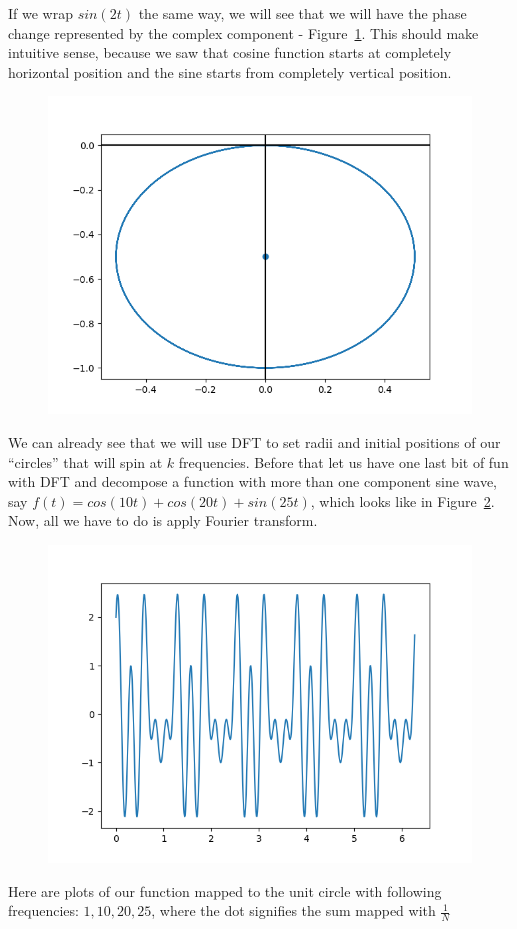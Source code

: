 \documentclass{article}
\begin{document}
    If we wrap $sin(2t)$ the same way, we will see that we will have the phase
    change represented by the complex component - Figure~\ref{fig:sin_wrapped_2k}.
    This should make intuitive sense, because we saw that cosine function starts
    at completely horizontal position and the sine starts from completely vertical
    position. 
    \begin{figure}[H]
        \caption{}
        \centering
        \includegraphics[width=0.4\linewidth]{sin_wrapped_2k}
        \label{fig:sin_wrapped_2k}
    \end{figure}
    We can already see that we will use DFT to set radii and initial positions
    of our ``circles'' that will spin at $k$ frequencies. Before that let us have
    one last bit of fun with DFT and decompose a function with more than one 
    component sine wave, say $f(t) = cos(10t) + cos(20t) + sin(25t)$, which looks
    like in Figure~\ref{fig:composed}. Now, all we have to do is apply Fourier
    transform.
    \begin{figure}[H]
        \caption{}
        \centering
        \includegraphics[width=0.4\linewidth]{composed}
        \label{fig:composed}
    \end{figure}
    Here are plots of our function mapped to the unit circle with following
    frequencies: $1, 10, 20, 25$, where the dot signifies the sum mapped with 
    $\frac{1}{N}$
\end{document}
